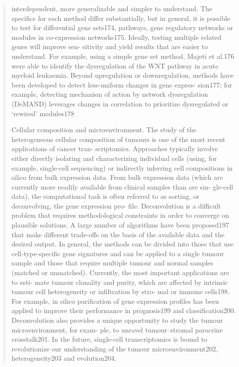 \documentclass[12pt,]{book}
\theoremstyle{definition}
\theoremstyle{definition}
\theoremstyle{definition}
\theoremstyle{remark}
\begin{document}
\begin{quote}
interdependent, more generalizable and simpler to understand. The
specifics for each method differ substantially, but in general, it is
possible to test for differential gene sets174, pathways, gene
regulatory networks or modules in co-expression networks175. Ideally,
testing multiple related genes will improve sen- sitivity and yield
results that are easier to understand. For example, using a simple gene
set method, Majeti et al.176 were able to identify the dysregulation of
the WNT pathway in acute myeloid leukaemia. Beyond upregulation or
downregulation, methods have been developed to detect less-uniform
changes in gene expres- sion177; for example, detecting mechanism of
action by network dysregulation (DeMAND) leverages changes in
correlation to prioritize dysregulated or `rewired' modules178

Cellular composition and microenvironment. The study of the
heterogeneous cellular composition of tumours is one of the most recent
applications of cancer tran- scriptomics. Approaches typically involve
either directly isolating and characterizing individual cells (using,
for example, single-cell sequencing) or indirectly inferring cell
compositions in silico from bulk expression data. From bulk expression
data (which are currently more readily available from clinical samples
than are sin- gle-cell data), the computational task is often referred
to as sorting, or deconvolving, the gene expression pro- file.
Deconvolution is a difficult problem that requires methodological
constraints in order to converge on plausible solutions. A large number
of algorithms have been proposed197 that make different trade-offs on
the basis of the available data and the desired output. In general, the
methods can be divided into those that use cell-type-specific gene
signatures and can be applied to a single tumour sample and those that
require multiple tumour and normal samples (matched or unmatched).
Currently, the most important applications are to esti- mate tumour
clonality and purity, which are affected by intrinsic tumour cell
heterogeneity or infiltration by stro- mal or immune cells198. For
example, in silico purification of gene expression profiles has been
applied to improve their performance in prognosis199 and
classification200. Deconvolution also provides a unique opportunity to
study the tumour microenvironment, for exam- ple, to unravel
tumour--stromal paracrine crosstalk201. In the future, single-cell
transcriptomics is bound to revolutionize our understanding of the
tumour microenvironment202, heterogeneity203 and evolution204.


\end{quote}
\end{document}
